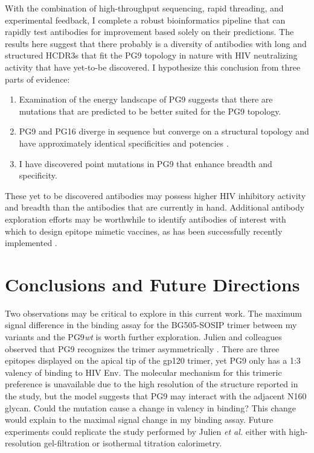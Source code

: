 With the combination of high-throughput sequencing, rapid threading, and experimental feedback, I complete a robust bioinformatics pipeline that can rapidly test antibodies for improvement based solely on their \silico predictions. The results here suggest that there probably is a diversity of antibodies with long and structured HCDR3s that fit the PG9 topology in nature with HIV neutralizing activity that have yet-to-be discovered. I hypothesize this conclusion from three parts of evidence:
\begin{enumerate}
\item Examination of the energy landscape of PG9 suggests that there are mutations that are predicted to be better suited for the PG9 topology.
\item PG9 and PG16 diverge in sequence but converge on a structural topology and have approximately identical specificities and potencies \citep{McLellan:2011dg,Pejchal:2010fp,Pancera:2010hh}.
\item I have discovered point mutations in PG9 that enhance breadth and specificity.
\end{enumerate}
These yet to be discovered antibodies may possess higher HIV inhibitory activity and breadth than the antibodies that are currently in hand. Additional antibody exploration efforts may be worthwhile to identify antibodies of interest with which to design epitope mimetic vaccines, as has been successfully recently implemented \citep{Correia:2014jp,Jardine:2013hb}.



\section{Conclusions and Future Directions}
Two observations may be critical to explore in this current work. The maximum signal difference in the binding assay for the BG505-SOSIP trimer between my variants and the PG9\textit{wt} is worth further exploration. Julien and colleagues observed that PG9 recognizes the trimer asymmetrically \citep{Julien:2013jp}. There are three epitopes displayed on the apical tip of the gp120 trimer, yet PG9 only has a 1:3 valency of binding to HIV Env. The molecular mechanism for this trimeric preference is unavailable due to the high resolution of the structure reported in the study, but the model suggests that PG9 may interact with the adjacent N160 glycan. Could the mutation cause a change in valency in binding? This change would explain to the maximal signal change in my binding assay. Future experiments could replicate the study performed by Julien \textit{et al.} either with high-resolution gel-filtration or isothermal titration calorimetry.

